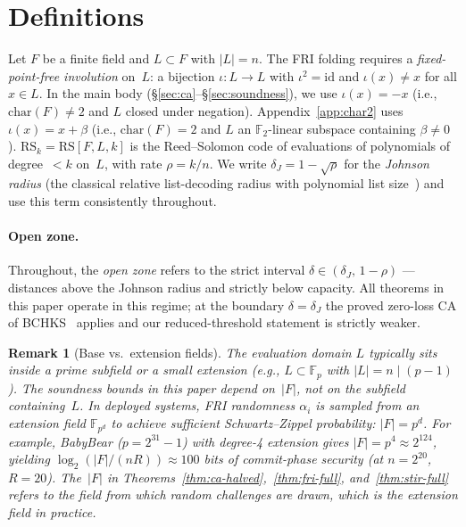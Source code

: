 \documentclass[11pt]{article}
\newtheorem{remark}[theorem]{Remark}
\newcommand{\FF}{\mathbb{F}}
\newcommand{\RS}{\mathrm{RS}}
\begin{document}
\section{Definitions}
\label{sec:prelim}

Let $F$ be a finite field and $L \subset F$ with $|L| = n$. The FRI folding requires a \emph{fixed-point-free involution} on~$L$: a bijection $\iota: L \to L$ with $\iota^2 = \mathrm{id}$ and $\iota(x) \neq x$ for all $x \in L$. In the main body (\S\ref{sec:ca}--\S\ref{sec:soundness}), we use $\iota(x) = -x$ (i.e., $\mathrm{char}(F) \neq 2$ and $L$ closed under negation). Appendix~\ref{app:char2} uses $\iota(x) = x + \beta$ (i.e., $\mathrm{char}(F) = 2$ and $L$ an $\FF_2$-linear subspace containing $\beta \neq 0$). $\RS_k = \RS[F, L, k]$ is the Reed--Solomon code of evaluations of polynomials of degree~${<}k$ on~$L$, with rate $\rho = k/n$. We write $\delta_J = 1 - \sqrt{\rho}$ for the \emph{Johnson radius} (the classical relative list-decoding radius with polynomial list size~\cite{Sudan97,GuruswamiSudan}) and use this term consistently throughout.

\paragraph{Open zone.}
Throughout, the \emph{open zone} refers to the strict interval $\delta \in (\delta_J,\, 1{-}\rho)$ --- distances above the Johnson radius and strictly below capacity.  All theorems in this paper operate in this regime; at the boundary $\delta = \delta_J$ the proved zero-loss CA of BCHKS~\cite{BCHKS} applies and our reduced-threshold statement is strictly weaker.

\begin{remark}[Base vs.\ extension fields]
\label{rem:extension}
The evaluation domain $L$ typically sits inside a prime subfield or a small extension (e.g., $L \subset \FF_p$ with $|L| = n \mid (p-1)$). The soundness bounds in this paper depend on~$|F|$, not on the subfield containing~$L$. In deployed systems, FRI randomness $\alpha_i$ is sampled from an extension field $\FF_{p^d}$ to achieve sufficient Schwartz--Zippel probability: $|F| = p^d$. For example, BabyBear ($p = 2^{31}-1$) with degree-4 extension gives $|F| = p^4 \approx 2^{124}$, yielding $\log_2(|F|/(nR)) \approx 100$ bits of commit-phase security (at $n = 2^{20}$, $R = 20$). The~$|F|$ in Theorems~\ref{thm:ca-halved},~\ref{thm:fri-full}, and~\ref{thm:stir-full} refers to the field from which random challenges are drawn, which is the extension field in practice.
\end{remark}
\end{document}
